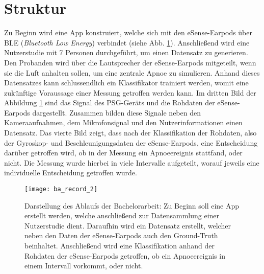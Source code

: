 \section{Struktur}
Zu Beginn wird eine App konstruiert, welche sich mit den eSense-Earpods über BLE (\textit{Bluetooth Low Energy}) verbindet (siehe Abb. \ref{introduction:ba_record}).
Anschließend wird eine Nutzerstudie mit 7 Personen durchgeführt, um einen Datensatz zu generieren.
Den Probanden wird über die Lautsprecher der eSense-Earpods mitgeteilt, wenn sie die Luft anhalten sollen, um eine zentrale Apnoe zu simulieren.
Anhand dieses Datensatzes kann schlussendlich ein Klassifikator trainiert werden, womit eine zukünftige Voraussage einer Messung getroffen werden kann.
Im dritten Bild der Abbildung \ref{introduction:ba_record} sind das Signal des PSG-Geräts und die Rohdaten der eSense-Earpods dargestellt. 
Zusammen bilden diese Signale neben den Kameraaufnahmen, dem Mikrofonsignal und den Nutzerinformationen einen Datensatz.
Das vierte Bild zeigt, dass nach der Klassifikation der Rohdaten, also der Gyroskop- und Beschleunigungsdaten der eSense-Earpods, eine Entscheidung darüber getroffen wird, ob in der Messung ein Apnoeereignis stattfand, oder nicht.
Die Messung wurde hierbei in viele Intervalle aufgeteilt, worauf jeweils eine individuelle Entscheidung getroffen wurde.

\begin{figure}[h]
  \centering
  \texttt{[image: ba\_record\_2]}
  \caption{Darstellung des Ablaufs der Bachelorarbeit: Zu Beginn soll eine App erstellt werden, welche anschließend zur Datensammlung einer Nutzerstudie dient. Daraufhin wird ein Datensatz erstellt, welcher neben den Daten der eSense-Earpods auch den Ground-Truth beinhaltet. Anschließend wird eine Klassifikation anhand der Rohdaten der eSense-Earpods getroffen, ob ein Apnoeereignis in einem Intervall vorkommt, oder nicht.}
  \label{introduction:ba_record}
\end{figure}